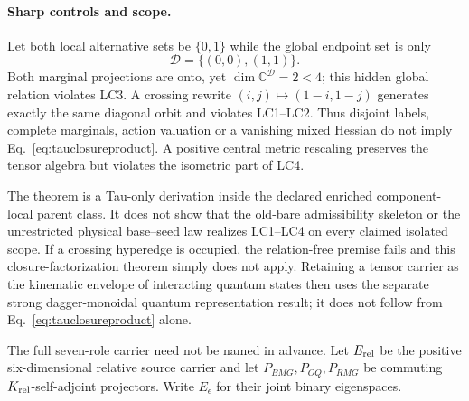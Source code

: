 \documentclass[11pt]{article}
\begin{document}
\paragraph{Sharp controls and scope.}
Let both local alternative sets be $\{0,1\}$ while the global endpoint set is
only
\begin{equation}
 \mathcal D=\{(0,0),(1,1)\}.
 \label{eq:tauhiddendiagonal}
\end{equation}
Both marginal projections are onto, yet
$\dim\mathbb C^{\mathcal D}=2<4$; this hidden global relation violates LC3.
A crossing rewrite $(i,j)\mapsto(1-i,1-j)$ generates exactly the same
diagonal orbit and violates LC1--LC2.  Thus disjoint labels, complete
marginals, action valuation or a vanishing mixed Hessian do not imply
Eq.~\eqref{eq:tauclosureproduct}.  A positive central metric rescaling
preserves the tensor algebra but violates the isometric part of LC4.

The theorem is a Tau-only derivation inside the declared enriched
component-local parent class.  It does not show that the old-bare
admissibility skeleton or the unrestricted physical base--seed law realizes
LC1--LC4 on every claimed isolated scope.  If a crossing hyperedge is
occupied, the relation-free premise fails and this closure-factorization
theorem simply does not apply.  Retaining a tensor carrier as the kinematic
envelope of interacting quantum states then uses the separate strong
dagger-monoidal quantum representation result; it does not follow from
Eq.~\eqref{eq:tauclosureproduct} alone.

The full seven-role carrier need not be named in advance.  Let
$E_{\rm rel}$ be the positive six-dimensional relative source carrier and let
$P_{BMG},P_{OQ},P_{RMG}$ be commuting $K_{\rm rel}$-self-adjoint
projectors.  Write $E_{\epsilon}$ for their joint binary eigenspaces.
\end{document}

